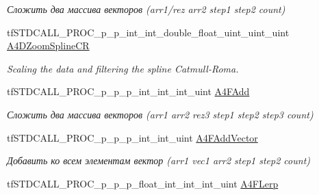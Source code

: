 \begin{DoxyCompactItemize}
\begin{DoxyCompactList}\small\item\em Сложить два массива векторов (arr1/rez arr2 step1 step2 count) \end{DoxyCompactList}\item 
\hypertarget{structs_functions_array_vector_c_p_u_abc2aad54b4cf1e18b08fab2f09374ba1}{tf\-S\-T\-D\-C\-A\-L\-L\-\_\-\-P\-R\-O\-C\-\_\-p\-\_\-p\-\_\-int\-\_\-int\-\_\-double\-\_\-float\-\_\-uint\-\_\-uint\-\_\-uint \hyperlink{structs_functions_array_vector_c_p_u_abc2aad54b4cf1e18b08fab2f09374ba1}{A4\-D\-Zoom\-Spline\-C\-R}}\label{structs_functions_array_vector_c_p_u_abc2aad54b4cf1e18b08fab2f09374ba1}

\begin{DoxyCompactList}\small\item\em Scaling the data and filtering the spline Catmull-\/\-Roma. \end{DoxyCompactList}\item 
\hypertarget{structs_functions_array_vector_c_p_u_a0392d80b5d8d3fb7770704965ff0cc99}{tf\-S\-T\-D\-C\-A\-L\-L\-\_\-\-P\-R\-O\-C\-\_\-p\-\_\-p\-\_\-p\-\_\-int\-\_\-int\-\_\-int\-\_\-uint \hyperlink{structs_functions_array_vector_c_p_u_a0392d80b5d8d3fb7770704965ff0cc99}{A4\-F\-Add}}\label{structs_functions_array_vector_c_p_u_a0392d80b5d8d3fb7770704965ff0cc99}

\begin{DoxyCompactList}\small\item\em Сложить два массива векторов (arr1 arr2 rez3 step1 step2 step3 count) \end{DoxyCompactList}\item 
\hypertarget{structs_functions_array_vector_c_p_u_acf9992a62c709a9a8a24d709452ae509}{tf\-S\-T\-D\-C\-A\-L\-L\-\_\-\-P\-R\-O\-C\-\_\-p\-\_\-p\-\_\-p\-\_\-int\-\_\-int\-\_\-uint \hyperlink{structs_functions_array_vector_c_p_u_acf9992a62c709a9a8a24d709452ae509}{A4\-F\-Add\-Vector}}\label{structs_functions_array_vector_c_p_u_acf9992a62c709a9a8a24d709452ae509}

\begin{DoxyCompactList}\small\item\em Добавить ко всем элементам вектор (arr1 vec1 arr2 step1 step2 count) \end{DoxyCompactList}\item 
\hypertarget{structs_functions_array_vector_c_p_u_a5ee20e8221b386f2668e6f48ed4c1e08}{tf\-S\-T\-D\-C\-A\-L\-L\-\_\-\-P\-R\-O\-C\-\_\-p\-\_\-p\-\_\-p\-\_\-float\-\_\-int\-\_\-int\-\_\-int\-\_\-uint \hyperlink{structs_functions_array_vector_c_p_u_a5ee20e8221b386f2668e6f48ed4c1e08}{A4\-F\-Lerp}}\label{structs_functions_array_vector_c_p_u_a5ee20e8221b386f2668e6f48ed4c1e08}


\end{DoxyCompactItemize}

